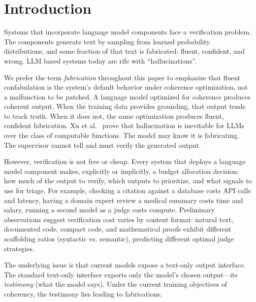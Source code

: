 \balance
\section{Introduction}\label{sec:intro}

Systems that incorporate language model components face a verification problem.
The components generate text by sampling from learned probability distributions,
and some fraction of that text is fabricated: fluent, confident, and wrong.
LLM based systems today are rife with ``hallucinations''.


We prefer the term \emph{fabrication} throughout this paper to emphasize that
fluent confabulation is the system's default behavior under coherence
optimization, not a malfunction to be patched. A language model optimized for
coherence produces coherent output. When the training data provides grounding,
that output tends to track truth. When it does not, the same optimization
produces fluent, confident fabrication. Xu et
al.~\cite{xu2024hallucination} prove that hallucination is
inevitable for LLMs over the class of computable functions. 
The model may know it is fabricating. The supervisor cannot tell
and must verify the generated output.

However, verification is not free or cheap. Every system that
deploys a language model component makes, explicitly or implicitly, a budget
allocation decision: how much of the output to verify, which outputs to
prioritize, and what signals to use for triage. 
For example, checking a citation against a database costs API
calls and latency, having a domain expert review a medical summary costs time
and salary, running a second model as a judge costs compute.
Preliminary observations suggest verification cost varies by content format:
natural text, documented code, compact code, and mathematical proofs exhibit
different scaffolding ratios (syntactic vs. semantic), predicting different optimal judge strategies. 

The underlying issue is that current models
expose a text-only output interface. The standard
text-only interface exports only the model's chosen output---its
\emph{testimony} (what the model says).
Under the current training objectives of coherency, the testimony
lies leading to fabrications.

